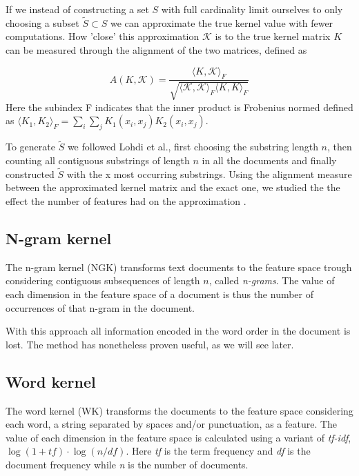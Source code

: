 If we instead of constructing a set $ S $ with full cardinality limit ourselves to only choosing a subset $ \tilde{S} \subset S $ we can approximate the true kernel value with fewer computations. How 'close' this approximation $ \mathcal{K} $ is to the true kernel matrix $ K $ can be measured through the alignment of the two matrices, defined as

\begin{equation}\label{key}
A(K,\mathcal{K}) = \dfrac{\langle K, \mathcal{K}\rangle_{F}}{\sqrt{\langle \mathcal{K}, \mathcal{K}\rangle_{F} \langle K, K\rangle_{F} }}
\end{equation}
Here the subindex F indicates that the inner product is Frobenius normed defined as $ \langle K_1,K_2 \rangle_{F} = \sum_{i}\sum_{j}K_1(x_i,x_j)K_2(x_i,x_j) $.

To generate $ \tilde{S} $ we followed Lohdi et al., first choosing the substring length $ n $, then counting all contiguous substrings of length $ n $ in all the documents and finally constructed $ \tilde{S} $ with the x most occurring substrings. Using the alignment measure between the approximated kernel matrix and the exact one, we studied the the effect the number of features had on the approximation
. 
\subsection{N-gram kernel}
The n-gram kernel (NGK) transforms text documents to the feature space trough  considering contiguous subsequences of length $ n $, called \textit{n-grams}. The value of each dimension in the feature space of a document is thus the number of occurrences of that n-gram in the document. 

With this approach all information encoded in the word order in the document is lost. The method has nonetheless proven useful, as we will see later.

\subsection{Word kernel}
The word kernel (WK) transforms the documents to the feature space considering each word, a string separated by spaces and/or punctuation, as a feature. The value of each dimension in the feature space is calculated using a variant of \textit{tf-idf}, $ \log(1+tf) \cdot \log(n/df) $. Here \textit{tf} is the term frequency and \textit{df} is the document frequency while \textit{n} is the number of documents. 

